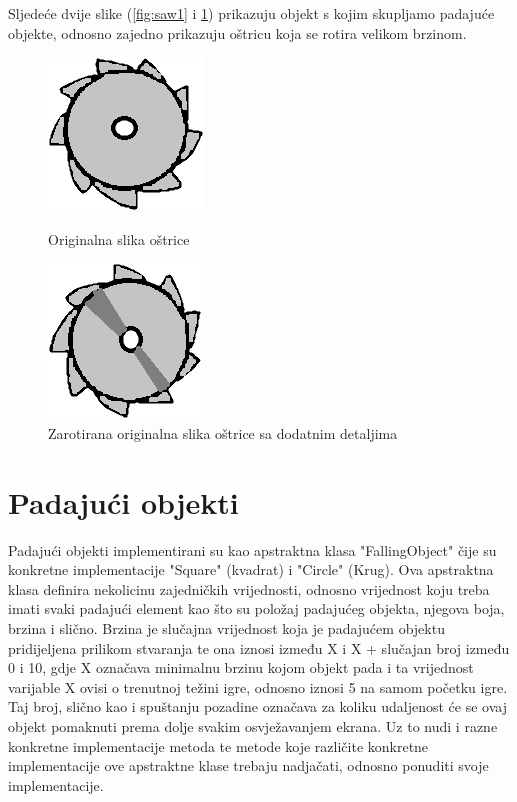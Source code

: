 \documentclass[times, utf8, zavrsni, numeric]{fer}
\begin{document}
	Sljedeće dvije slike (\ref{fig:saw1} i \ref{fig:saw2}) prikazuju objekt s kojim skupljamo padajuće objekte, odnosno zajedno prikazuju oštricu koja se rotira velikom brzinom.
	
		\begin{figure}[!htb]
			\begin{minipage}{0.48\textwidth}
				\centering
				\includegraphics[scale=0.6]{"slike/saw1.png"} 
				\caption{Originalna slika oštrice}
				\label{fig:saw1}
			\end{minipage}\hfill
			\begin{minipage}{0.48\textwidth}
				\centering
				\includegraphics[scale=0.6]{"slike/saw2.png"} 
				\caption{Zarotirana originalna slika oštrice sa dodatnim detaljima}
				\label{fig:saw2}
			\end{minipage}
		\end{figure}
	
	\section{Padajući objekti}
	Padajući objekti implementirani su kao apstraktna klasa "FallingObject" čije su konkretne implementacije "Square" (kvadrat) i "Circle" (Krug). Ova apstraktna klasa definira nekolicinu zajedničkih vrijednosti, 
	odnosno vrijednost koju treba imati svaki padajući element kao što su položaj padajućeg objekta, njegova boja, brzina i slično.
	Brzina je slučajna vrijednost koja je padajućem objektu pridijeljena prilikom stvaranja te ona iznosi između X i X + slučajan broj između 0 i 10, gdje X označava minimalnu brzinu kojom objekt pada i ta vrijednost
	varijable X ovisi o trenutnoj težini igre, odnosno iznosi 5 na samom početku igre. Taj broj, slično kao i spuštanju pozadine označava za koliku udaljenost će se ovaj objekt pomaknuti prema dolje svakim osvježavanjem ekrana.
	Uz to nudi i razne konkretne implementacije metoda te metode koje različite konkretne implementacije ove apstraktne klase trebaju nadjačati, odnosno ponuditi svoje implementacije. 
	
\end{document}
